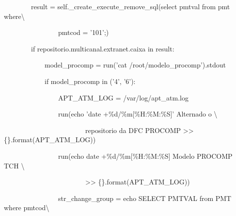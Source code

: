 {\ttfamily\color[rgb]{0.10980392,0.10980392,0.10980392}
    \ \ \ \ \ \ \ \ result = self.\_create\_execute\_remove\_sql({\textquotedbl}select pmtval from pmt
            where{\textbackslash}}

            {\ttfamily\color[rgb]{0.10980392,0.10980392,0.10980392}
            \ \ \ \ \ \ \ \ \ \ \ \ \ \ \ \ pmtcod = '101';{\textquotedbl})}

{\ttfamily\color[rgb]{0.10980392,0.10980392,0.10980392}
    \ \ \ \ \ \ \ \ if {\textquotedbl}repositorio.multicanal.extranet.caixa{\textquotedbl} in result:}

{\ttfamily\color[rgb]{0.10980392,0.10980392,0.10980392}
    \ \ \ \ \ \ \ \ \ \ \ \ model\_procomp = run('cat /root/modelo\_procomp').stdout}

{\ttfamily\color[rgb]{0.10980392,0.10980392,0.10980392}
    \ \ \ \ \ \ \ \ \ \ \ \ if model\_procomp in ('4', '6'):}

{\ttfamily\color[rgb]{0.10980392,0.10980392,0.10980392}
    \ \ \ \ \ \ \ \ \ \ \ \ \ \ \ \ APT\_ATM\_LOG = {\textquotedbl}/var/log/apt\_atm.log{\textquotedbl}}

{\ttfamily\color[rgb]{0.10980392,0.10980392,0.10980392}
    \ \ \ \ \ \ \ \ \ \ \ \ \ \ \ \ run({\textquotedbl}{\textquotedbl}{\textquotedbl}echo {\textquotedbl}'date
            +\%d/\%m[\%H:\%M:\%S]' Alternado o {\textbackslash}}

            {\ttfamily\color[rgb]{0.10980392,0.10980392,0.10980392}
            \ \ \ \ \ \ \ \ \ \ \ \ \ \ \ \ \ \ \ \ \ \ \ \ repositorio da DFC PROCOMP{\textquotedbl} {\textgreater}{\textgreater}
            \{\}{\textquotedbl}{\textquotedbl}{\textquotedbl}.format(APT\_ATM\_LOG))}

{\ttfamily\color[rgb]{0.10980392,0.10980392,0.10980392}
    \ \ \ \ \ \ \ \ \ \ \ \ \ \ \ \ run({\textquotedbl}{\textquotedbl}{\textquotedbl}echo
            {\textquotedbl}{\textasciigrave}date +\%d/\%m[\%H:\%M:\%S]{\textasciigrave} Modelo PROCOMP TCH{\textquotedbl}
            {\textbackslash}}

            {\ttfamily\color[rgb]{0.10980392,0.10980392,0.10980392}
            \ \ \ \ \ \ \ \ \ \ \ \ \ \ \ \ \ \ \ \ \ \ \ \ {\textgreater}{\textgreater}
            \{\}{\textquotedbl}{\textquotedbl}{\textquotedbl}.format(APT\_ATM\_LOG))}


    \bigskip

{\ttfamily\color[rgb]{0.10980392,0.10980392,0.10980392}
    \ \ \ \ \ \ \ \ \ \ \ \ \ \ \ \ str\_change\_group = {\textquotedbl}{\textquotedbl}{\textquotedbl}echo
    {\textquotedbl}SELECT PMTVAL from PMT where pmtcod{\textbackslash}}

